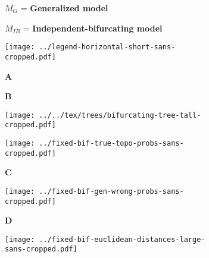 \documentclass[border=10pt,varwidth=30cm]{standalone}
\begin{document}
\begin{figure}
    \centering
    \begin{subfigure}[c][][c]{0.44\textwidth}
        \centering
        \Huge $M_{G}$ = \textbf{Generalized model}
    \end{subfigure}
    \hfill
    \begin{subfigure}[c][][c]{0.54\textwidth}
        \centering
        \Huge $M_{IB}$ = \textbf{Independent-bifurcating model}
    \end{subfigure}
    \vspace{2mm}
    \begin{subfigure}[c][][c]{\textwidth}
        \centering
        \texttt{[image: ../legend-horizontal-short-sans-cropped.pdf]}
    \end{subfigure}
    \vspace{2mm}
    \begin{subfigure}[b][][l]{0.55\textwidth}
        \huge \textbf{A}
    \end{subfigure}
    \hfill
    \begin{subfigure}[b][][l]{0.43\textwidth}
        \huge \textbf{B}
    \end{subfigure}
    \vspace{2mm}
    \begin{subfigure}[c][][c]{0.55\textwidth}
        \centering
        \texttt{[image: ../../tex/trees/bifurcating-tree-tall-cropped.pdf]}
        \label{fig:gentree}
    \end{subfigure}
    \hfill
    \begin{subfigure}[c][][c]{0.43\textwidth}
        \centering
        \texttt{[image: ../fixed-bif-true-topo-probs-sans-cropped.pdf]}
    \end{subfigure}
    \begin{subfigure}[b][][l]{\textwidth}
        \huge \textbf{C}
    \end{subfigure}
    \begin{subfigure}[c][][c]{\textwidth}
        \centering
        \texttt{[image: ../fixed-bif-gen-wrong-probs-sans-cropped.pdf]}
    \end{subfigure}
    \begin{subfigure}[b][][l]{\textwidth}
        \huge \textbf{D}
    \end{subfigure}
    \begin{subfigure}[c][][c]{\textwidth}
        \centering
        \texttt{[image: ../fixed-bif-euclidean-distances-large-sans-cropped.pdf]}
    \end{subfigure}
\end{figure}
\end{document}
